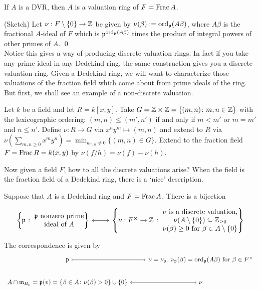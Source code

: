 \begin{prop}
If $A$ is a DVR, then $A$ is a valuation ring of $F=\operatorname{Frac} A$.  
\end{prop}

\pf (Sketch) Let $\nu: F \setminus \{0\} \to \mathbb{Z}$ be given by $\nu(\beta):= \operatorname{ord}_{\mathfrak{p}}(A\beta)$, where $A\beta$ is the fractional $A$-ideal of $F$ which is $\mathfrak{p}^{\operatorname{ord}_{\mathfrak{p}}(A\beta)}$ times the product of integral powers of other primes of $A$. \qed \\

Notice this gives a way of producing discrete valuation rings. In fact if you take any prime ideal in any Dedekind ring, the same construction gives you a discrete valuation ring. Given a Dedekind ring, we will want to characterize those valuations of the fraction field which come about from prime ideals of the ring. But first, we shall see an example of a non-discrete valuation. 

\begin{ex}
Let $k$ be a field and let $R=k[x,y]$. Take $G= \mathbb{Z} \times \mathbb{Z}=\{(m,n) \colon m,n \in \mathbb{Z}\}$ with the lexicographic ordering: $(m,n) \leq (m',n')$ if and only if $m<m'$ or $m=m'$ and $n \leq n'$. Define $\nu: R \to G$ via $x^ny^m \mapsto (m,n)$ and extend to $R$ via $\nu(\sum_{m,n \geq 0} x^my^n)=\min_{a_{m,n} \neq 0} \{(m,n) \in G\}$. Extend to the fraction field $F=\operatorname{Frac} R=k(x,y)$ by $\nu(f/h)= \nu(f) - \nu(h)$. 
\end{ex}

Now given a field $F$, how to all the discrete valuations arise? When the field is the fraction field of a Dedekind ring, there is a `nice' description. 

\begin{thm}
Suppose that $A$ is a Dedekind ring and $F=\operatorname{Frac} A$. There is a bijection
	\[
	\begin{tikzcd}
	\left\{ \p \; \colon \; \begin{array}{@{}c@{}} \p \text{ nonzero prime} \\ \text{ideal of }A \end{array} \right\} \arrow[leftrightarrow]{r} &  \left\{ \nu: F^\times \to \Z \; \colon \; \begin{array}{@{}c@{}} \nu \text{ is a discrete valuation,} \\ \nu(A \setminus\{0\}) \subseteq \Z_{\geq 0} \\ \nu(\beta) \geq 0 \text{ for } \beta \in A\setminus\{0\}\end{array} \right\}
	\end{tikzcd}
	\]
The correspondence is given by
	\[
	\begin{tikzcd}
	\p \arrow[mapsto]{r} & \nu=\nu_\p \colon \nu_\p(\beta)= \ord_\p(A\beta) \text{ for } \beta \in F^\times \\
	A \cap \m_{B_\nu}= \p(v)=\{\beta \in A \colon \nu(\beta)>0\} \cup \{0\} & \nu \arrow[mapsto]{l}
	\end{tikzcd}
	\]
\end{thm}

